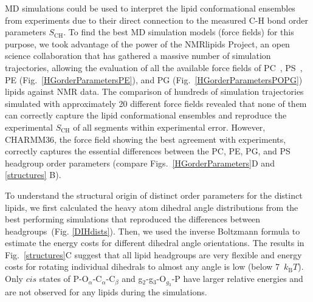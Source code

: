 \documentclass[aps,prl,superscriptaddress,twocolumn]{revtex4}
\begin{document}
MD simulations could be used to interpret the lipid conformational ensembles from experiments due to their direct connection to the measured C-H bond order parameters $S_\mathrm{CH}$. To find the best MD simulation models (force fields) for this purpose, we took advantage of the power of the NMRlipids Project, an open science collaboration that has gathered a massive number of simulation trajectories, allowing the evaluation of all the available force fields of PC~\cite{botan15}, PS~\cite{antila19}, PE (Fig.~\ref{HGorderParametersPE}), and PG (Fig.~\ref{HGorderParametersPOPG}) lipids against NMR data. The comparison of hundreds of simulation trajectories simulated with approximately 20 different force fields revealed that none of them can correctly capture the lipid conformational ensembles and reproduce the experimental $S_\mathrm{CH}$ of all segments within experimental error. However, CHARMM36, the force field showing the best agreement with experiments, correctly captures the essential differences between the PC, PE, PG, and PS headgroup order parameters (compare Figs.~\ref{HGorderParameters}D and \ref{structures} B). 

To understand the structural origin of distinct order parameters for the distinct lipids,
we first calculated the heavy atom dihedral angle distributions from the best performing simulations that reproduced the differences between headgroups~(Fig. \ref{DIHdists}).
Then, we used the inverse Boltzmann formula to estimate the
energy costs for different dihedral angle orientations.
The results in Fig.~\ref{structures}C suggest that all lipid headgroups are very flexible and
energy costs for rotating individual dihedrals to almost any angle is low (below 7~$k_\mathrm{B}T$).
Only $cis$ states of P-O$_\alpha$-C$_\alpha$-C$_\beta$ and g$_2$-g$_3$-O$_{g_3}$-P have larger relative
energies and are not observed for any lipids during the simulations.
\end{document}
